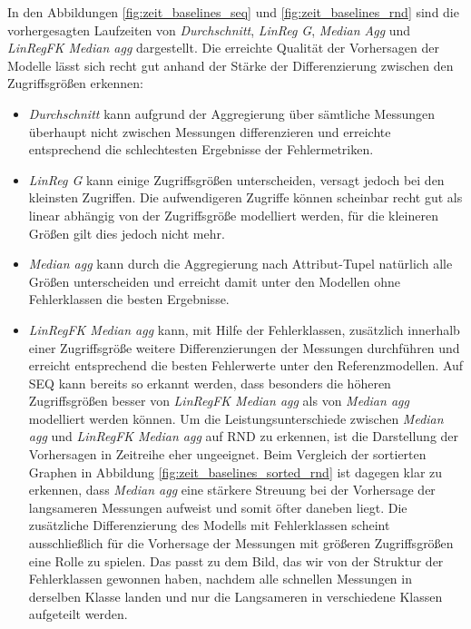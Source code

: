 \documentclass[
	twoside,
	12pt,
	a4paper,
	BCOR10mm,
	DIV14,
	listof=totoc,
	bibliography=totoc,
	headsepline
]{scrreprt}
\begin{document}
In den Abbildungen \ref{fig:zeit_baselines_seq} und \ref{fig:zeit_baselines_rnd} sind die vorhergesagten Laufzeiten von \textit{Durchschnitt}, \textit{LinReg G}, \textit{Median Agg} und \textit{LinRegFK Median agg} dargestellt.
Die erreichte Qualität der Vorhersagen der Modelle lässt sich recht gut anhand der Stärke der Differenzierung zwischen den Zugriffsgrößen erkennen:
\begin{itemize}
	\item \textit{Durchschnitt} kann aufgrund der Aggregierung über sämtliche Messungen überhaupt nicht zwischen Messungen differenzieren und erreichte entsprechend die schlechtesten Ergebnisse der Fehlermetriken.
	\item \textit{LinReg G} kann einige Zugriffsgrößen unterscheiden, versagt jedoch bei den kleinsten Zugriffen. Die aufwendigeren Zugriffe können scheinbar recht gut als linear abhängig von der Zugriffsgröße modelliert werden, für die kleineren Größen gilt dies jedoch nicht mehr.
	\item \textit{Median agg} kann durch die Aggregierung nach Attribut-Tupel natürlich alle Größen unterscheiden und erreicht damit unter den Modellen ohne Fehlerklassen die besten Ergebnisse. 
	\item \textit{LinRegFK Median agg} kann, mit Hilfe der Fehlerklassen, zusätzlich innerhalb einer Zugriffsgröße weitere Differenzierungen der Messungen durchführen und erreicht entsprechend die besten Fehlerwerte unter den Referenzmodellen.
	Auf SEQ kann bereits so erkannt werden, dass besonders die höheren Zugriffsgrößen besser von \textit{LinRegFK Median agg} als von \textit{Median agg} modelliert werden können.
	Um die Leistungsunterschiede zwischen \textit{Median agg} und \textit{LinRegFK Median agg} auf RND zu erkennen, ist die Darstellung der Vorhersagen in Zeitreihe eher ungeeignet.
	Beim Vergleich der sortierten Graphen in Abbildung \ref{fig:zeit_baselines_sorted_rnd} ist dagegen klar zu erkennen, dass \textit{Median agg} eine stärkere Streuung bei der Vorhersage der langsameren Messungen aufweist und somit öfter daneben liegt.
	Die zusätzliche Differenzierung des Modells mit Fehlerklassen scheint ausschließlich für die Vorhersage der Messungen mit größeren Zugriffsgrößen eine Rolle zu spielen.
	Das passt zu dem Bild, das wir von der Struktur der Fehlerklassen gewonnen haben, nachdem alle schnellen Messungen in derselben Klasse landen und nur die Langsameren in verschiedene Klassen aufgeteilt werden.
\end{itemize}
\end{document}
